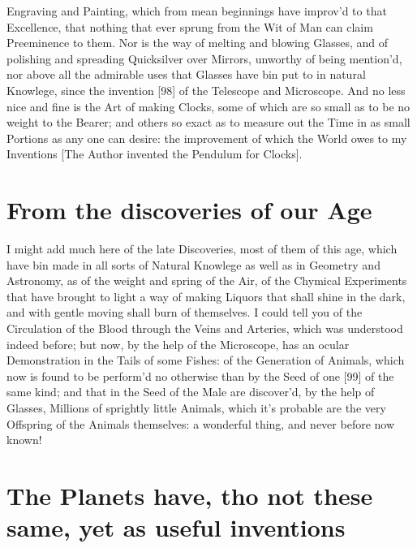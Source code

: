 \documentclass[letterpaper]{book}
\begin{document}
Engraving and Painting, which from mean beginnings have improv'd to that
Excellence, that nothing that ever sprung from the Wit of Man can claim
Preeminence to them. Nor is the way of melting and blowing Glasses, and of
polishing and spreading Quicksilver over Mirrors, unworthy of being
mention'd, nor above all the admirable uses that Glasses have bin put to in
natural Knowlege, since the invention [98] of the Telescope and Microscope.
And no less nice and fine is the Art of making Clocks, some of which are so
small as to be no weight to the Bearer; and others so exact as to measure
out the Time in as small Portions as any one can desire: the improvement of
which the World owes to my Inventions [The Author invented the Pendulum for
Clocks].


\section{From the discoveries of our Age}

I might add much here of the late Discoveries, most of them of this age,
which have bin made in all sorts of Natural Knowlege as well as in Geometry
and Astronomy, as of the weight and spring of the Air, of the Chymical
Experiments that have brought to light a way of making Liquors that shall
shine in the dark, and with gentle moving shall burn of themselves. I could
tell you of the Circulation of the Blood through the Veins and Arteries,
which was understood indeed before; but now, by the help of the Microscope,
has an ocular Demonstration in the Tails of some Fishes: of the Generation
of Animals, which now is found to be perform'd no otherwise than by the Seed
of one [99] of the same kind; and that in the Seed of the Male are
discover'd, by the help of Glasses, Millions of sprightly little Animals,
which it's probable are the very Offspring of the Animals themselves: a
wonderful thing, and never before now known!


\section{The Planets have, tho not these same, yet as useful inventions}
\end{document}
